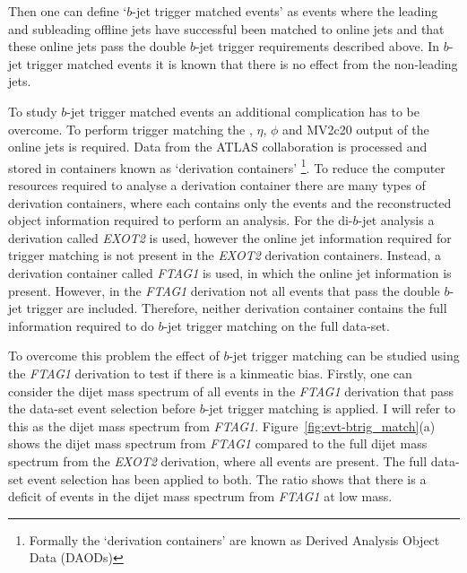 Then one can define `$b$-jet trigger matched events' as events where
the leading and subleading offline jets have successful been matched to online jets
and that these online jets pass the double $b$-jet trigger requirements described above.
In $b$-jet trigger matched events it is known that there is no effect from the non-leading jets.

To study $b$-jet trigger matched events an additional complication has to be overcome.
To perform trigger matching the \pT, $\eta$, $\phi$ and MV2c20 output of the online jets is required.
Data from the ATLAS collaboration is processed and stored in containers known as `derivation containers'
\footnote{Formally the `derivation containers' are known as Derived Analysis Object Data (DAODs)}.
To reduce the computer resources required to analyse a derivation container
there are many types of derivation containers,
where each contains only the events and the reconstructed object information required to perform an analysis.
For the di-$b$-jet analysis a derivation called \textit{EXOT2} is used,
however the online jet information required for trigger matching is not present in the \textit{EXOT2} derivation containers.
Instead, a derivation container called \textit{FTAG1} is used, in which the online jet information is present.
However, in the \textit{FTAG1} derivation not all events that pass the double $b$-jet trigger are included.
Therefore, neither derivation container contains the full information required to do $b$-jet trigger matching on the full \lm{} data-set.

To overcome this problem the effect of $b$-jet trigger matching can be studied using the \textit{FTAG1} derivation
to test if there is a kinmeatic bias.
Firstly, one can consider the dijet mass spectrum of all events in the \textit{FTAG1} derivation
that pass the \lm{} data-set event selection before $b$-jet trigger matching is applied.
I will refer to this as the dijet mass spectrum from \textit{FTAG1}.
Figure~\ref{fig:evt-btrig_match}(a) shows the dijet mass spectrum from \textit{FTAG1}
compared to the full dijet mass spectrum from the \textit{EXOT2} derivation, where all events are present.
The full \lm{} data-set event selection has been applied to both.
The ratio shows that there is a deficit of events in the dijet mass spectrum from \textit{FTAG1} at low mass.

